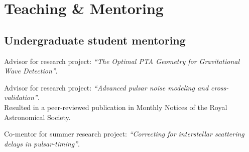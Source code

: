 \documentclass[11pt,letterpaper,sans]{moderncv}
\begin{document}
\section{Teaching \& Mentoring}

\subsection{Undergraduate student mentoring}

\vspace{-0.1cm}
\hspace{0.71cm} Advisor for research project: \textit{``The Optimal PTA Geometry for Gravitational Wave Detection''}.%

\vspace{-0.1cm}
\hspace{0.71cm} Advisor for research project: \textit{``Advanced pulsar noise modeling and cross-validation''}. \\
\vspace{-0.1cm}
\hspace{0.6cm} Resulted in a peer-reviewed publication in Monthly Notices of the Royal Astronomical Society. \vspace{0.1cm}

\vspace{-0.1cm}
\hspace{0.71cm} Co-mentor for summer research project: \textit{``Correcting for interstellar scattering \\ \vspace{-0.1cm}
\hspace{0.6cm} delays in pulsar-timing''}. \vspace{0.1cm}
\end{document}
